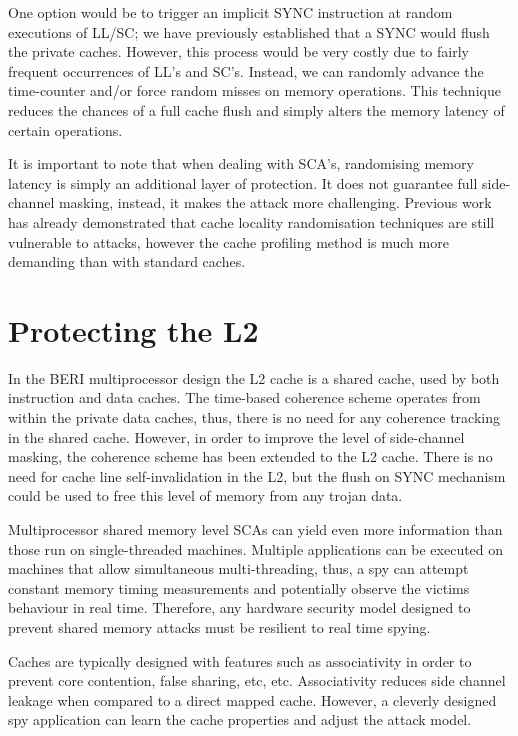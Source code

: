 		One option would be to trigger an implicit SYNC instruction at random executions of LL/SC; we have previously established that a SYNC would flush the private caches. However, this process would be very costly due to fairly frequent occurrences of LL's and SC's. Instead, we can randomly advance the time-counter and/or force random misses on memory operations. This technique reduces the chances of a full cache flush and simply alters the memory latency of certain operations.
		
		It is important to note that when dealing with SCA's, randomising memory latency is simply an additional layer of protection. It does not guarantee full side-channel masking, instead, it makes the attack more challenging. Previous work has already demonstrated that cache locality randomisation techniques are still vulnerable to attacks, however the cache profiling method is much more demanding than with standard caches. 
	
\section{Protecting the L2}
	In the BERI multiprocessor design the L2 cache is a shared cache, used by both instruction and data caches. The time-based coherence scheme operates from within the private data caches, thus, there is no need for any coherence tracking in the shared cache. However, in order to improve the level of side-channel masking, the coherence scheme has been extended to the L2 cache. There is no need for cache line self-invalidation in the L2, but the flush on SYNC mechanism could be used to free this level of memory from any trojan data.
	
	Multiprocessor shared memory level SCAs can yield even more information than those run on single-threaded machines. Multiple applications can be executed on machines that allow simultaneous multi-threading, thus, a spy can attempt constant memory timing measurements and potentially observe the victims behaviour in real time. Therefore, any hardware security model designed to prevent shared memory attacks must be resilient to real time spying. 
	
	Caches are typically designed with features such as associativity in order to prevent core contention, false sharing, etc, etc. Associativity reduces side channel leakage when compared to a direct mapped cache. However, a cleverly designed spy application can learn the cache properties and adjust the attack model. 
	
